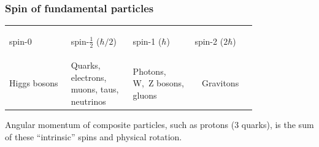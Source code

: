 \documentclass[compress]{beamer}
\begin{document}
\begin{frame}
\frametitle{Spin of fundamental particles}

\vspace{-0.6 cm}
\begin{tabular}{p{0.2\linewidth} p{0.2\linewidth} p{0.2\linewidth} p{0.2\linewidth}}
\begin{center} spin-0 \end{center} & \begin{center} spin-$\frac{1}{2}$ ($\hbar/2$) \end{center} & \begin{center} spin-1 ($\hbar$) \end{center} & \begin{center} spin-2 ($2\hbar$) \end{center} \\
Higgs bosons & Quarks, electrons, muons, taus, neutrinos & Photons, \mbox{W, Z} bosons, gluons & \mbox{ } \hfill Gravitons \hfill \mbox{ } \\
\end{tabular}

\vspace{0.2 cm}
Angular momentum of composite particles, such as protons (3 quarks), is the sum of these ``intrinsic'' spins and physical rotation.

\vfill
\hspace{-0.83 cm} 

\vspace{0.2 cm}

\end{frame}
\end{document}
